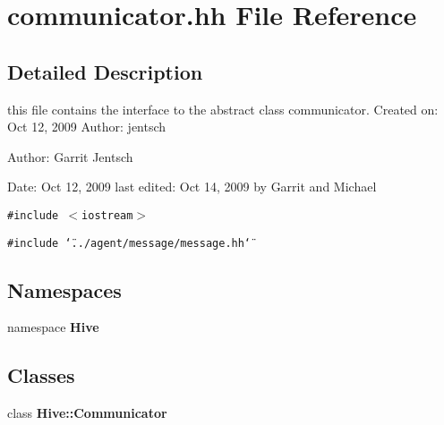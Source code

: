 \section{communicator.hh File Reference}
\label{communicator_8hh}


\subsection{Detailed Description}
this file contains the interface to the abstract class communicator. Created on: Oct 12, 2009 Author: jentsch

\begin{Desc}
\item[Author:]Garrit Jentsch \end{Desc}
\begin{Desc}
\item[Date:]Oct 12, 2009 last edited: Oct 14, 2009 by Garrit and Michael \end{Desc}


{\tt \#include $<$iostream$>$}\par
{\tt \#include \char`\"{}../agent/message/message.hh\char`\"{}}\par
\subsection*{Namespaces}
\begin{CompactItemize}
\item 
namespace {\bf Hive}
\end{CompactItemize}
\subsection*{Classes}
\begin{CompactItemize}
\item 
class {\bf Hive::Communicator}
\end{CompactItemize}
